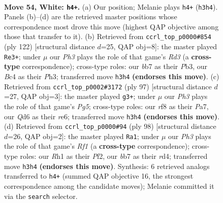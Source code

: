 \documentclass[11pt]{article}
\begin{document}
\clearpage

\begin{figure}[p]\centering
\begin{subfigure}{0.46\textwidth}\centering
\resizebox{\linewidth}{!}{%
\newchessgame
\chessboard[
  setfen={5r2/1b6/3Q4/6k1/2B5/7P/1p4P1/6KR w - - 17 54},
  showmover=false,
  pgfstyle=straightmove, color=movearrow, markmove={h3-h4}
]}
\caption{}
\end{subfigure}\hfill
\begin{subfigure}{0.46\textwidth}\centering
\resizebox{\linewidth}{!}{%
\newchessgame
\chessboard[
  setfen={8/7p/4k3/2p5/5rP1/1P1R3P/4K3/8 w - - 20 62},
  showmover=false,
  pgfstyle=straightmove, color=movearrow, markmove={d3-e3}
]}
\caption{}
\end{subfigure}
\\[4pt]
\begin{subfigure}{0.46\textwidth}\centering
\resizebox{\linewidth}{!}{%
\newchessgame
\chessboard[
  setfen={8/p7/4R1p1/8/rk4pP/8/5K2/8 b - - 1 49},
  showmover=false,
  pgfstyle=straightmove, color=movearrow, markmove={g4-g3}
]}
\caption{}
\end{subfigure}\hfill
\begin{subfigure}{0.46\textwidth}\centering
\resizebox{\linewidth}{!}{%
\newchessgame
\chessboard[
  setfen={8/8/5k2/1Bb4p/3r1P1P/5K2/5P2/5R2 w - - 1 50},
  showmover=false,
  pgfstyle=straightmove, color=movearrow, markmove={f1-a1}
]}
\caption{}
\end{subfigure}
\caption{\textbf{Move 54, White: \texttt{h4+}.} (a) Our position; Melanie plays \texttt{h4+} (\texttt{h3h4}). Panels (b)--(d) are the retrieved master positions whose correspondence most drove this move (highest QAP objective among those that transfer to it). (b) Retrieved from \texttt{ccrl\_top\_p0000\#854} (ply 122) [structural distance $d$=25, QAP obj=8]: the master played \texttt{Re3+}; under $\mu$ our \emph{Ph3} plays the role of that game's \emph{Rd3} (a \textbf{cross-type} correspondence); cross-type roles: our \emph{b}b7 as their \emph{P}b3, our \emph{B}c4 as their \emph{P}h3; transferred move \texttt{h3h4} \textbf{(endorses this move)}. (c) Retrieved from \texttt{ccrl\_top\_p0002\#3172} (ply 97) [structural distance $d$=27, QAP obj=3]: the master played \texttt{g3+}; under $\mu$ our \emph{Ph3} plays the role of that game's \emph{Pg5}; cross-type roles: our \emph{r}f8 as their \emph{P}a7, our \emph{Q}d6 as their \emph{r}e6; transferred move \texttt{h3h4} \textbf{(endorses this move)}. (d) Retrieved from \texttt{ccrl\_top\_p0000\#94} (ply 98) [structural distance $d$=26, QAP obj=2]: the master played \texttt{Ra1}; under $\mu$ our \emph{Ph3} plays the role of that game's \emph{Rf1} (a \textbf{cross-type} correspondence); cross-type roles: our \emph{R}h1 as their \emph{P}f2, our \emph{b}b7 as their \emph{r}d4; transferred move \texttt{h3h4} \textbf{(endorses this move)}. Synthesis: 6 retrieved analogs transferred to \texttt{h4+} (summed QAP objective 16, the strongest correspondence among the candidate moves); Melanie committed it via the \texttt{search} selector.}
\label{fig:thought-m106}
\end{figure}
\end{document}
